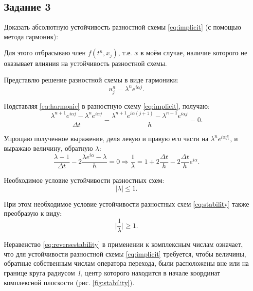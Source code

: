 \documentclass[12pt, a4paper]{report}
\begin{document}
	\subsection*{Задание 3}
	\large
	Доказать абсолютную устойчивость разностной схемы \eqref{eq:implicit} (с помощью метода гармоник): \par
	Для этого отбрасываю член $f(t^{n}, x_{j})$, т.е. $x$ в моём случае, наличие которого не оказывает влияния на устойчивость разностной схемы. \par
	Представлю решение разностной схемы в виде гармоники:
	\begin{equation}\label{eq:harmonic}
		u_{j}^{n} = \lambda^{n}e^{i \alpha j}.
	\end{equation}
	\par
	Подставляя \eqref{eq:harmonic} в разностную схему \eqref{eq:implicit}, получаю:
	\begin{equation*}
		\frac{\lambda^{n+1}e^{i \alpha j} - \lambda^{n}e^{i \alpha j}}{\Delta t} - \frac{\lambda^{n+1}e^{i \alpha (j+1)} - \lambda^{n+1}e^{i \alpha j}}{h} = 0.
	\end{equation*}
	\par
	Упрощаю полученное выражение, деля левую и правую его части на $\lambda^{n}e^{i \alpha j)}$, и выражаю величину, обратную $\lambda$:
	\begin{equation*}
		\frac{\lambda - 1}{\Delta t} - 2\frac{\lambda e^{i \alpha} - \lambda}{h} = 0 \Rightarrow \frac{1}{\lambda} = 1 + 2\frac{\Delta t}{h} - 2\frac{\Delta t}{h}e^{i \alpha}.
	\end{equation*}
	\par
	Необходимое условие устойчивости разностных схем:
	\begin{equation}\label{eq:stability}
		\lvert \lambda \rvert \leq 1.
	\end{equation}
	\par
	При этом необходимое условие устойчивости разностных схем \eqref{eq:stability} также преобразую к виду:
	\begin{equation}\label{eq:reversestability}
		\lvert \frac{1}{\lambda} \rvert \geq 1.
	\end{equation}
	\par
	Неравенство \eqref{eq:reversestability} в применении к комплексным числам означает, что для устойчивости разностной схемы \eqref{eq:implicit} требуется, чтобы величины, обратные собственным числам оператора перехода, были расположены вне или на границе круга радиусом \textit{1}, центр которого находится в начале координат комплексной плоскости (рис. \ref{fig:stability}).
\end{document}
